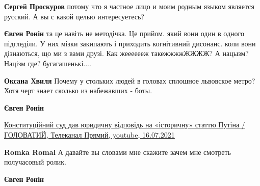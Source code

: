 \begin{itemize}
\begin{itemize}
\textbf{Сергей Проскуров} потому что я частное лицо и моим родным языком является русский. А вы с какой целью интересуетесь?

 
\textbf{Євген Ронін} та це навіть не методічка. Це прийом. який вони один в одного підгледіли. У них мізки закипають і приходить когнітивний дисонанс. коли вони дізнаються, що ми з вами друзі. Как жееееееж такежжжжЖЖЖЖ? А нацызм? Націзм где? бугагашенькі....

 
\textbf{Оксана Хвиля} Почему у стольких людей в головах сплошное львовское метро? Хотя черт знает сколько из набежавших - боты.

 
\textbf{Євген Ронін}

\href{https://www.youtube.com/watch?v=vvL0XGUc5qA}{%
Конституційний суд дав юридичну відповідь на «історичну» статтю Путіна / ГОЛОВАТИЙ, %
Телеканал Прямий, %
youtube, 16.07.2021%
}

 
\textbf{Romka Romal} А давайте вы словами мне скажите зачем мне смотреть получасовый ролик.

 
\textbf{Євген Ронін} 


\end{itemize}
\end{itemize}
